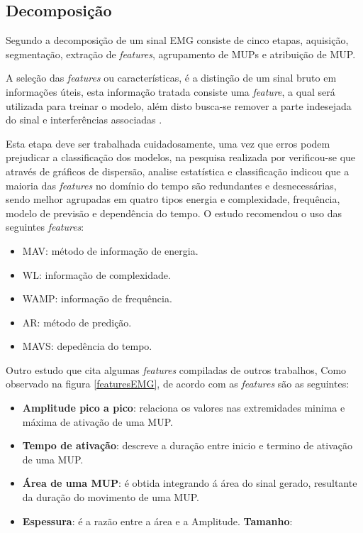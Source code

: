 \subsection{Decomposição}
Segundo  a decomposição de um sinal EMG consiste de cinco etapas, aquisição, segmentação, extração de \textit{features}, agrupamento de MUPs e atribuição de MUP.

A seleção das \textit{features} ou características, é a distinção de um sinal bruto em informações úteis, esta informação tratada consiste uma \textit{feature}, a qual será utilizada para treinar o modelo, além disto busca-se remover a parte indesejada do sinal e interferências associadas \cite{phinyomark2012feature}.

Esta etapa deve ser trabalhada cuidadosamente, uma vez que erros podem prejudicar a classificação dos modelos, na pesquisa realizada por  verificou-se que através de gráficos de dispersão, analise estatística e classificação indicou que a maioria das \textit{features} no domínio do tempo são redundantes e desnecessárias, sendo melhor agrupadas em quatro tipos energia e complexidade, frequência, modelo de previsão e dependência do tempo. O estudo recomendou o uso das seguintes \textit{features}:

\begin{itemize}
    \item MAV: método de informação de energia.
    \item WL: informação de complexidade.
    \item WAMP: informação de frequência.
    \item AR: método de predição.
    \item MAVS: depedência  do tempo.
\end{itemize}

Outro estudo que cita algumas \textit{features} compiladas de outros trabalhos, Como observado na figura \ref{featuresEMG}, de acordo com  as \textit{features} são as seguintes:

\begin{itemize}
    \item \textbf{Amplitude pico a pico}: relaciona os valores nas extremidades minima e máxima de ativação de uma MUP.
    \item \textbf{Tempo de ativação}: descreve a duração entre inicio e termino de ativação de uma MUP.
    \item \textbf{Área de uma MUP}: é obtida integrando á área do sinal gerado, resultante da duração do movimento de uma MUP.
    \item \textbf{Espessura}: é a razão entre a área e a Amplitude.
    \textbf{Tamanho}:
\end{itemize}

